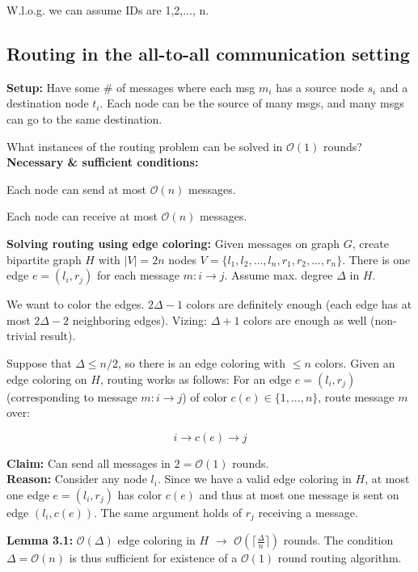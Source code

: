 \documentclass[a4paper, 8pt, landscape]{scrartcl}
\begin{document}
\begin{multicols*}{3}
W.l.o.g. we can assume IDs are 1,2,..., n.

\subsection{Routing in the all-to-all communication setting}

\textbf{Setup:} Have some \# of messages where each msg $m_i$ has a source node $s_i$ and a destination node $t_i$. Each node can be the source of many msgs, and many msgs can go to the same destination.

What instances of the routing problem can be solved in $\mathcal{O}(1)$ rounds?
\textbf{Necessary \& sufficient conditions:}

\begin{compactitem}
\item Each node can send at most $\mathcal{O}(n)$ messages.
\item Each node can receive at most $\mathcal{O}(n)$ messages.
\end{compactitem}

\textbf{Solving routing using edge coloring:} Given messages on graph $G$, create bipartite graph $H$ with $|V| = 2n$ nodes $V = \{l_1, l_2, ..., l_n, r_1, r_2, ..., r_n\}$. There is one edge $e = (l_i, r_j)$ for each message $m: i \rightarrow j$. Assume max. degree $\Delta$ in $H$.

We want to color the edges. $2\Delta - 1$ colors are definitely enough (each edge has at most $2\Delta - 2$ neighboring edges). Vizing: $\Delta+1$ colors are enough as well (non-trivial result).

Suppose that $\Delta \leq n/2$, so there is an edge coloring with $\leq n$ colors. Given an edge coloring on $H$, routing works as follows: For an edge $e = (l_i, r_j)$ (corresponding to message $m: i \rightarrow j$) of color $c(e) \in \{1,...,n\}$, route message $m$ over:

\vspace*{-4mm}
$$i \rightarrow c(e) \rightarrow j$$
\vspace*{-6mm}

\textbf{Claim:} Can send all messages in $2 = \mathcal{O}(1)$ rounds.\\
\textbf{Reason:} Consider any node $l_i$. Since we have a valid edge coloring in $H$, at most one edge $e = (l_i, r_j)$ has color $c(e)$ and thus at most one message is sent on edge $(l_i, c(e))$. The same argument holds of $r_j$ receiving a message. 

\textbf{Lemma 3.1:} $\mathcal{O}(\Delta)$ edge coloring in $H$ $\rightarrow$ $\mathcal{O}(\lceil \frac{\Delta}{n}\rceil )$ rounds. The condition $\Delta = \mathcal{O}(n)$ is thus sufficient for existence of a $\mathcal{O}(1)$ round routing algorithm.



\end{multicols*}
\end{document}
